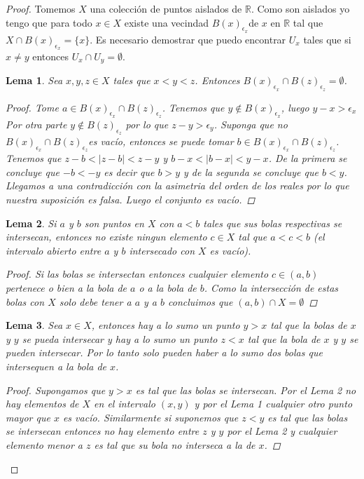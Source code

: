 \documentclass[letter,twoside,11pt]{article}
\newtheorem{lemma}{Lema}
\begin{document}
\begin{enumerate}
\begin{proof}
Tomemos $X$ una colecci\'on de puntos aislados de $\mathbb{R}$. Como son aislados yo tengo que para todo $x \in X$ existe una vecindad $B(x)_{\epsilon_x}$de $x$ en $\mathbb{R}$ tal que $X\cap B(x)_{\epsilon_x}=\{x\}$. Es necesario demostrar que puedo encontrar $U_{x}$ tales que si $x \not = y$ entonces $U_{x}\cap U_{y}=\emptyset$.

\begin{lemma}
Sea $x ,y ,z \in X$ tales que $x<y<z$. Entonces $B(x)_{\epsilon_x} \cap  B(z)_{\epsilon_z} =\emptyset$.

\begin{proof}
Tome $a \in B(x)_{\epsilon_x} \cap B(z)_{\epsilon_z}$. Tenemos que $y \not \in B(x)_{\epsilon_x}$, luego $y-x>\epsilon_x$ Por otra parte $y \not \in B(z)_{\epsilon_z}$ por lo que $z-y>\epsilon_y$. Suponga que no $ B(x)_{\epsilon_x} \cap B(z)_{\epsilon_z} $es vac\'io, entonces se puede tomar $b \in B(x)_{\epsilon_x} \cap  B(z)_{\epsilon_z}$. Tenemos que $z-b<|z-b|<z-y$ y $b-x<|b-x|<y-x$. De la primera se concluye que $-b<-y$ es decir que $b>y$ y de la segunda se concluye que $b<y$. Llegamos a una contradicci\'on con la asimetria del orden de los reales por lo que nuestra suposici\'on es falsa. Luego el conjunto es vac\'io.
\end{proof}
\end{lemma}

\begin{lemma}
Si $a$ y $b$ son puntos en $X$ con $a<b$ tales que sus bolas respectivas se intersecan, entonces no existe ningun elemento $c \in X$ tal que $a<c<b$ (el intervalo abierto entre $a$ y $b$ intersecado con $X$ es vac\'io).
\begin{proof}
Si las bolas se intersectan entonces cualquier elemento $c \in (a,b)$ pertenece o bien a la bola de $a$ o a la bola de $b$. Como la intersecci\'on de estas bolas con $X$ solo debe tener a $a$ y a $b$ concluimos que $(a,b) \cap X= \emptyset$
\end{proof}
\end{lemma}
\begin{lemma}
Sea $x \in X$, entonces hay a lo sumo un punto $y>x$ tal que la bolas de $x$ y $y$ se pueda intersecar y hay a lo sumo un punto $z<x$ tal que la bola de $x$ y $y$ se pueden intersecar. Por lo tanto solo pueden haber a lo sumo dos bolas que intersequen a la bola de $x$.

\begin{proof}
Supongamos que $y>x$ es tal que las bolas se intersecan. Por el Lema 2 no hay elementos de $X$ en el intervalo $(x,y)$ y por el Lema 1 cualquier otro punto mayor que $x$ es vac\'io. Similarmente si suponemos que $z<y$ es tal que las bolas se intersecan entonces no hay elemento entre $z$ y $y$ por el Lema 2 y cualquier elemento menor a $z$ es tal que su bola no interseca a la de $x$. 
\end{proof}
\end{lemma}


\end{proof}
\end{enumerate}
\end{document}
